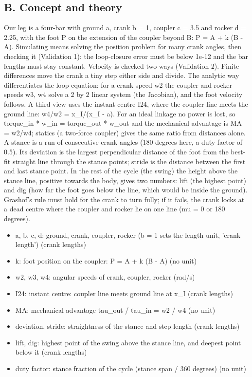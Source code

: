\documentclass[11pt,a4paper]{article}
\begin{document}
\subsection*{B. Concept and theory}
Our leg is a four-bar with ground a, crank b = 1, coupler c = 3.5 and rocker d = 2.25, with the foot P on the extension of the coupler beyond B: P = A + k (B - A). Simulating means solving the position problem for many crank angles, then checking it (Validation 1): the loop-closure error must be below 1e-12 and the bar lengths must stay constant. Velocity is checked two ways (Validation 2). Finite differences move the crank a tiny step either side and divide. The analytic way differentiates the loop equation: for a crank speed w2 the coupler and rocker speeds w3, w4 solve a 2 by 2 linear system (the Jacobian), and the foot velocity follows. A third view uses the instant centre I24, where the coupler line meets the ground line: w4/w2 = x\_I/(x\_I - a). For an ideal linkage no power is lost, so torque\_in * w\_in = torque\_out * w\_out and the mechanical advantage is MA = w2/w4; statics (a two-force coupler) gives the same ratio from distances alone. A stance is a run of consecutive crank angles (180 degrees here, a duty factor of 0.5). Its deviation is the largest perpendicular distance of the foot from the best-fit straight line through the stance points; stride is the distance between the first and last stance point. In the rest of the cycle (the swing) the height above the stance line, positive towards the body, gives two numbers: lift (the highest point) and dig (how far the foot goes below the line, which would be inside the ground). Grashof's rule must hold for the crank to turn fully; if it fails, the crank locks at a dead centre where the coupler and rocker lie on one line (mu = 0 or 180 degrees).

\begin{itemize}[nosep]
\item a, b, c, d: ground, crank, coupler, rocker (b = 1 sets the length unit, 'crank length') (crank lengths)
\item k: foot position on the coupler: P = A + k (B - A) (no unit)
\item w2, w3, w4: angular speeds of crank, coupler, rocker (rad/s)
\item I24: instant centre: coupler line meets ground line at x\_I (crank lengths)
\item MA: mechanical advantage tau\_out / tau\_in = w2 / w4 (no unit)
\item deviation, stride: straightness of the stance and step length (crank lengths)
\item lift, dig: highest point of the swing above the stance line, and deepest point below it (crank lengths)
\item duty factor: stance fraction of the cycle (stance span / 360 degrees) (no unit)
\end{itemize}
\end{document}
